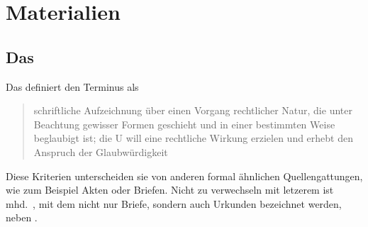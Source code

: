 \chapter{Materialien}
\label{ch:materialien}

\section[Das \tit{Corpus der altdeutschen Originalurkunden}]{Das }%
\label{sec:materialcao}

Das  definiert den Terminus  als
\blockcquote[574]{frenz1998a}{schriftliche Aufzeichnung über einen Vorgang
rechtlicher Natur, die unter Beachtung gewisser Formen geschieht und in einer
bestimmten Weise beglaubigt ist; die U will eine rechtliche
Wirkung erzielen und erhebt den Anspruch der Glaubwürdigkeit}. Diese Kriterien
unterscheiden sie von anderen formal ähnlichen Quellengattungen, wie zum
Beispiel Akten oder Briefen. Nicht zu verwechseln mit letzerem ist mhd.\
, mit dem nicht nur Briefe, sondern auch Urkunden bezeichnet
werden, neben \norm{hantvėste} \autocites[][\pno~\fw{brief},
]{mwb1}[][\pno~]{mwb2}[vgl. auch][]{schmidtwiegand1998a}.
% 

